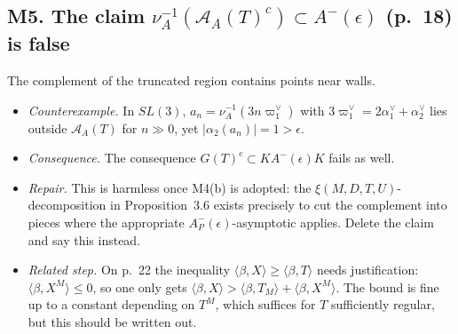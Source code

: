 \documentclass[11pt]{article}
\newcommand{\cA}{\mathcal{A}}
\newcommand{\ip}[1]{\langle #1\rangle}
\begin{document}
\subsection*{M5. The claim $\nu_A^{-1}(\cA_A(T)^c)\subset A^-(\epsilon)$ (p.~18) is false}
The complement of the truncated region contains points near walls.
\begin{itemize}
\item \emph{Counterexample.} In $SL(3)$, $a_n=\nu_A^{-1}(3n\varpi_1^\vee)$ with $3\varpi_1^\vee=2\alpha_1^\vee+\alpha_2^\vee$ lies outside $\cA_A(T)$ for $n\gg0$, yet $|\alpha_2(a_n)|=1>\epsilon$.
\item \emph{Consequence.} The consequence $G(T)^c\subset KA^-(\epsilon)K$ fails as well.
\item \emph{Repair.} This is harmless once M4(b) is adopted: the $\xi(M,D,T,U)$-decomposition in Proposition~3.6 exists precisely to cut the complement into pieces where the appropriate $A^-_P(\epsilon)$-asymptotic applies. Delete the claim and say this instead.
\item \emph{Related step.} On p.~22 the inequality $\ip{\beta,X}\ge\ip{\beta,T}$ needs justification: $\ip{\beta,X^M}\le0$, so one only gets $\ip{\beta,X}>\ip{\beta,T_M}+\ip{\beta,X^M}$. The bound is fine up to a constant depending on $T^M$, which suffices for $T$ sufficiently regular, but this should be written out.
\end{itemize}
\end{document}
